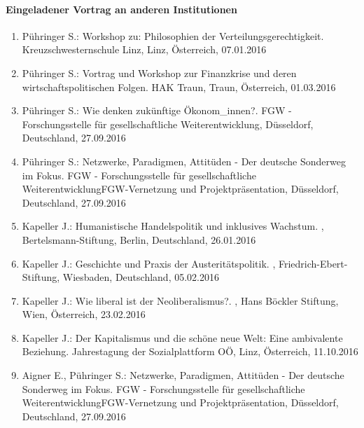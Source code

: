 \paragraph{Eingeladener Vortrag an anderen Institutionen}
\begin{enumerate}
	\item Pühringer S.: Workshop zu: Philosophien der Verteilungsgerechtigkeit. Kreuzschwesternschule Linz, Linz, Österreich, 07.01.2016
	\item Pühringer S.: Vortrag und Workshop zur Finanzkrise und deren wirtschaftspolitischen Folgen. HAK Traun, Traun, Österreich, 01.03.2016
	\item Pühringer S.: Wie denken zukünftige Ökonom\_innen?. FGW - Forschungsstelle für gesellschaftliche Weiterentwicklung, Düsseldorf, Deutschland, 27.09.2016
	\item Pühringer S.: Netzwerke, Paradigmen, Attitüden - Der deutsche Sonderweg im Fokus. FGW - Forschungsstelle für gesellschaftliche WeiterentwicklungFGW-Vernetzung und Projektpräsentation, Düsseldorf, Deutschland, 27.09.2016
	\item Kapeller J.: Humanistische Handelspolitik und inklusives Wachstum. , Bertelsmann-Stiftung, Berlin, Deutschland, 26.01.2016
	\item Kapeller J.: Geschichte und Praxis der Austeritätspolitik. , Friedrich-Ebert-Stiftung, Wiesbaden, Deutschland, 05.02.2016
	\item Kapeller J.: Wie liberal ist der Neoliberalismus?. , Hans Böckler Stiftung, Wien, Österreich, 23.02.2016
	\item Kapeller J.: Der Kapitalismus und die schöne neue Welt: Eine ambivalente Beziehung. Jahrestagung der Sozialplattform OÖ, Linz, Österreich, 11.10.2016
	\item Aigner E., Pühringer S.: Netzwerke, Paradigmen, Attitüden - Der deutsche Sonderweg im Fokus. FGW - Forschungsstelle für gesellschaftliche WeiterentwicklungFGW-Vernetzung und Projektpräsentation, Düsseldorf, Deutschland, 27.09.2016
\end{enumerate}
